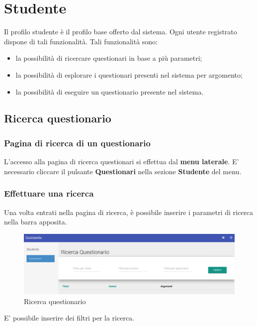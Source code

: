 \documentclass[12pt,a4paper]{article}
\begin{document}
	
	\newpage

	\section{Studente}\label{studente}
	Il profilo studente è il profilo  base offerto dal sistema. Ogni utente registrato dispone di tali funzionalità. Tali funzionalità sono:
	\begin{itemize}
		\item la possibilità di ricercare questionari in base a più parametri;
		\item la possibilità di esplorare i questionari presenti nel sistema per argomento;
		\item la possibilità di eseguire un questionario presente nel sistema.
	\end{itemize}
	
	\subsection{Ricerca questionario}\label{ricerca_questionario}
	\subsubsection{Pagina di ricerca  di un questionario}
	L'accesso alla pagina di ricerca questionari si effettua dal \textbf{menu laterale}. 
	E' necessario cliccare il pulsante \textbf{Questionari} nella sezione \textbf{Studente} del menu.
	\subsubsection{Effettuare una ricerca}
	Una volta entrati nella pagina di ricerca, è possibile inserire i parametri di ricerca nella barra apposita.
	
	\begin{figure}[H]	
		\centering
		\includegraphics[width=1.0\linewidth]{../img/screenshot/ricercaQuestionario.png}
		\caption{Ricerca questionario}
		\label{Ricerca questionario}
	\end{figure}
	
	E' possibile inserire dei filtri per la ricerca. 
	
\end{document}
